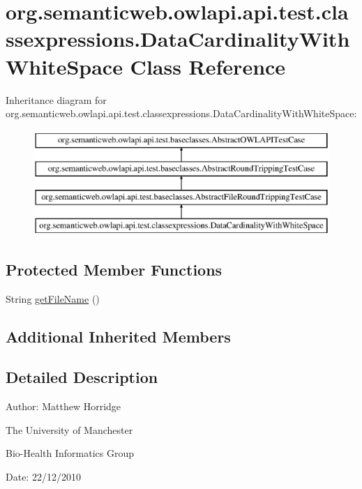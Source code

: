 \hypertarget{classorg_1_1semanticweb_1_1owlapi_1_1api_1_1test_1_1classexpressions_1_1_data_cardinality_with_white_space}{\section{org.\-semanticweb.\-owlapi.\-api.\-test.\-classexpressions.\-Data\-Cardinality\-With\-White\-Space Class Reference}
\label{classorg_1_1semanticweb_1_1owlapi_1_1api_1_1test_1_1classexpressions_1_1_data_cardinality_with_white_space}
}
Inheritance diagram for org.\-semanticweb.\-owlapi.\-api.\-test.\-classexpressions.\-Data\-Cardinality\-With\-White\-Space\-:\begin{figure}[H]
\begin{center}
\leavevmode
\includegraphics[height=4.000000cm]{classorg_1_1semanticweb_1_1owlapi_1_1api_1_1test_1_1classexpressions_1_1_data_cardinality_with_white_space}
\end{center}
\end{figure}
\subsection*{Protected Member Functions}
\begin{DoxyCompactItemize}
\item 
String \hyperlink{classorg_1_1semanticweb_1_1owlapi_1_1api_1_1test_1_1classexpressions_1_1_data_cardinality_with_white_space_ae872299a011bfe391fa17aec25145ea0}{get\-File\-Name} ()
\end{DoxyCompactItemize}
\subsection*{Additional Inherited Members}


\subsection{Detailed Description}
Author\-: Matthew Horridge\par
 The University of Manchester\par
 Bio-\/\-Health Informatics Group\par
 Date\-: 22/12/2010 

